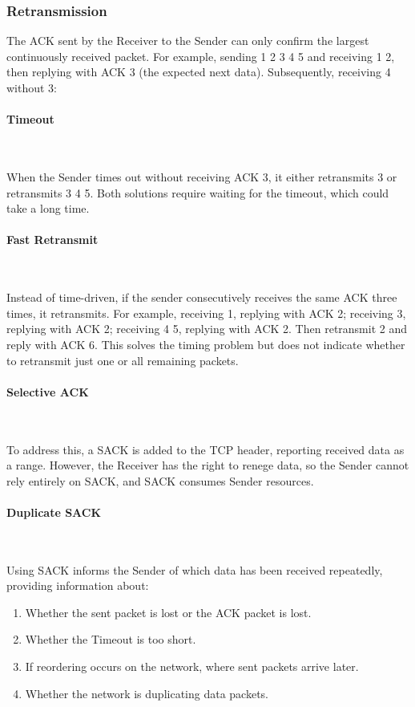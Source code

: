 \documentclass[11pt,journal,compsoc]{IEEEtran}
\begin{document}
\subsubsection{Retransmission}

The ACK sent by the Receiver to the Sender can only confirm the largest continuously received packet. For example, sending 1 2 3 4 5 and receiving 1 2, then replying with ACK 3 (the expected next data). Subsequently, receiving 4 without 3:

\paragraph{Timeout} ~

When the Sender times out without receiving ACK 3, it either retransmits 3 or retransmits 3 4 5. Both solutions require waiting for the timeout, which could take a long time.

\paragraph{Fast Retransmit} ~

Instead of time-driven, if the sender consecutively receives the same ACK three times, it retransmits. For example, receiving 1, replying with ACK 2; receiving 3, replying with ACK 2; receiving 4 5, replying with ACK 2. Then retransmit 2 and reply with ACK 6. This solves the timing problem but does not indicate whether to retransmit just one or all remaining packets.

\paragraph{Selective ACK} ~

To address this, a SACK is added to the TCP header, reporting received data as a range. However, the Receiver has the right to renege data, so the Sender cannot rely entirely on SACK, and SACK consumes Sender resources.

\paragraph{Duplicate SACK} ~

Using SACK informs the Sender of which data has been received repeatedly, providing information about:

\begin{enumerate}
    \item Whether the sent packet is lost or the ACK packet is lost.
    \item Whether the Timeout is too short.
    \item If reordering occurs on the network, where sent packets arrive later.
    \item Whether the network is duplicating data packets.
\end{enumerate}
\end{document}
